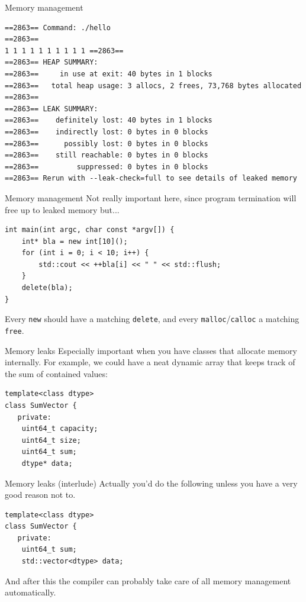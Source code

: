 \documentclass[11pt, aspectratio=169, table]{beamer}
\begin{document}
\begin{frame}[fragile]{Memory management}
\vspace{-0.5cm}
\begin{verbatim}
==2863== Command: ./hello
==2863==
1 1 1 1 1 1 1 1 1 1 ==2863==
==2863== HEAP SUMMARY:
==2863==     in use at exit: 40 bytes in 1 blocks
==2863==   total heap usage: 3 allocs, 2 frees, 73,768 bytes allocated
==2863==
==2863== LEAK SUMMARY:
==2863==    definitely lost: 40 bytes in 1 blocks
==2863==    indirectly lost: 0 bytes in 0 blocks
==2863==      possibly lost: 0 bytes in 0 blocks
==2863==    still reachable: 0 bytes in 0 blocks
==2863==         suppressed: 0 bytes in 0 blocks
==2863== Rerun with --leak-check=full to see details of leaked memory
\end{verbatim}
\end{frame}

\begin{frame}[fragile]{Memory management}
Not really important here, since program termination \linebreak
will free up to leaked memory but...

\begin{verbatim}
int main(int argc, char const *argv[]) {
    int* bla = new int[10]();
    for (int i = 0; i < 10; i++) {
        std::cout << ++bla[i] << " " << std::flush;
    }
    delete(bla);
}
\end{verbatim}

Every \texttt{new} should have a matching \texttt{delete}, \linebreak
and every \texttt{malloc}/\texttt{calloc} a matching \texttt{free}.
\end{frame}

\begin{frame}[fragile]{Memory leaks}
Especially important when you have classes that allocate memory internally. For example, we could 
have a neat dynamic array that keeps track of the sum of contained values:

\begin{verbatim}
template<class dtype>
class SumVector {
   private:
    uint64_t capacity;
    uint64_t size;
    uint64_t sum;
    dtype* data;
\end{verbatim}
\end{frame}

\begin{frame}[fragile]{Memory leaks (interlude)}
Actually you'd do the following unless you have a very good reason not to.

\begin{verbatim}
template<class dtype>
class SumVector {
   private:
    uint64_t sum;
    std::vector<dtype> data;
\end{verbatim}

And after this the compiler can probably take care of all memory management automatically.
\end{frame}
\end{document}
